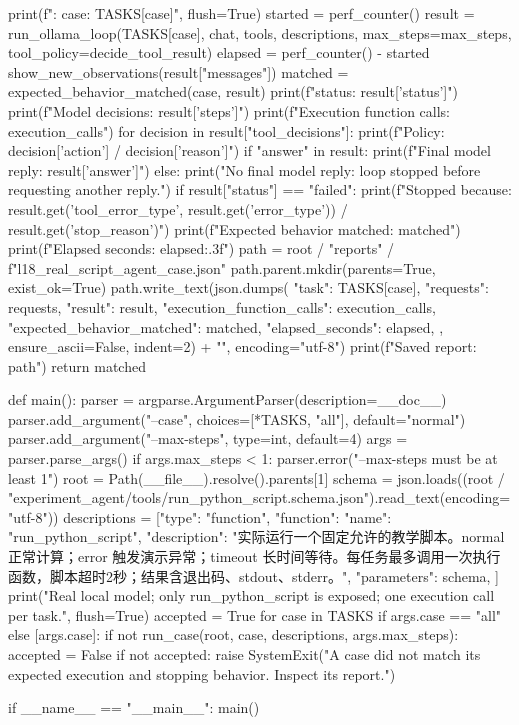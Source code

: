 \begin{Code}
    print(f"\nCase: {case}\nTask: {TASKS[case]}", flush=True)
    started = perf_counter()
    result = run_ollama_loop(TASKS[case], chat, tools, descriptions,
                             max_steps=max_steps, tool_policy=decide_tool_result)
    elapsed = perf_counter() - started
    show_new_observations(result["messages"])
    matched = expected_behavior_matched(case, result)
    print(f"\nLoop status: {result['status']}")
    print(f"Model decisions: {result['steps']}")
    print(f"Execution function calls: {execution_calls}")
    for decision in result["tool_decisions"]:
        print(f"Policy: {decision['action']} / {decision['reason']}")
    if "answer" in result:
        print(f"Final model reply: {result['answer']}")
    else:
        print("No final model reply: loop stopped before requesting another reply.")
    if result["status"] == "failed":
        print(f"Stopped because: {result.get('tool_error_type', result.get('error_type'))} / {result.get('stop_reason')}")
    print(f"Expected behavior matched: {matched}")
    print(f"Elapsed seconds: {elapsed:.3f}")
    path = root / "reports" / f"l18_real_script_agent_{case}.json"
    path.parent.mkdir(parents=True, exist_ok=True)
    path.write_text(json.dumps({
        "task": TASKS[case], "requests": requests, "result": result,
        "execution_function_calls": execution_calls, "expected_behavior_matched": matched,
        "elapsed_seconds": elapsed,
    }, ensure_ascii=False, indent=2) + "\n", encoding="utf-8")
    print(f"Saved report: {path}")
    return matched


def main():
    parser = argparse.ArgumentParser(description=__doc__)
    parser.add_argument("--case", choices=[*TASKS, "all"], default="normal")
    parser.add_argument("--max-steps", type=int, default=4)
    args = parser.parse_args()
    if args.max_steps < 1:
        parser.error("--max-steps must be at least 1")
    root = Path(__file__).resolve().parents[1]
    schema = json.loads((root / "experiment_agent/tools/run_python_script.schema.json").read_text(encoding="utf-8"))
    descriptions = [{"type": "function", "function": {
        "name": "run_python_script",
        "description": "实际运行一个固定允许的教学脚本。normal 正常计算；error 触发演示异常；timeout 长时间等待。每任务最多调用一次执行函数，脚本超时2秒；结果含退出码、stdout、stderr。",
        "parameters": schema,
    }}]
    print("Real local model; only run_python_script is exposed; one execution call per task.", flush=True)
    accepted = True
    for case in TASKS if args.case == "all" else [args.case]:
        if not run_case(root, case, descriptions, args.max_steps):
            accepted = False
    if not accepted:
        raise SystemExit("A case did not match its expected execution and stopping behavior. Inspect its report.")


if __name__ == "__main__":
    main()
\end{Code}

